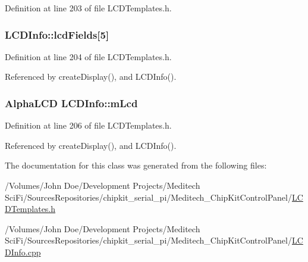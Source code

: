 Definition at line 203 of file L\-C\-D\-Templates.\-h.

\hypertarget{class_l_c_d_info_a74e827124b7095a16e00c3cff84213c7}{
\subsubsection[{lcd\-Fields}]{ L\-C\-D\-Info\-::lcd\-Fields\mbox{[}5\mbox{]}}}\label{class_l_c_d_info_a74e827124b7095a16e00c3cff84213c7}


Definition at line 204 of file L\-C\-D\-Templates.\-h.



Referenced by create\-Display(), and L\-C\-D\-Info().

\hypertarget{class_l_c_d_info_acc94f8a06df70cf4578c1d43f9dfa20b}{
\subsubsection[{m\-Lcd}]{\setlength{\rightskip}{0pt plus 5cm}Alpha\-L\-C\-D L\-C\-D\-Info\-::m\-Lcd\hspace{0.3cm}{\ttfamily [private]}}}\label{class_l_c_d_info_acc94f8a06df70cf4578c1d43f9dfa20b}


Definition at line 206 of file L\-C\-D\-Templates.\-h.



Referenced by create\-Display(), and L\-C\-D\-Info().



The documentation for this class was generated from the following files\-:\begin{DoxyCompactItemize}
\item 
/\-Volumes/\-John Doe/\-Development Projects/\-Meditech Sci\-Fi/\-Sources\-Repositories/chipkit\-\_\-serial\-\_\-pi/\-Meditech\-\_\-\-Chip\-Kit\-Control\-Panel/\hyperlink{_l_c_d_templates_8h}{L\-C\-D\-Templates.\-h}\item 
/\-Volumes/\-John Doe/\-Development Projects/\-Meditech Sci\-Fi/\-Sources\-Repositories/chipkit\-\_\-serial\-\_\-pi/\-Meditech\-\_\-\-Chip\-Kit\-Control\-Panel/\hyperlink{_l_c_d_info_8cpp}{L\-C\-D\-Info.\-cpp}\end{DoxyCompactItemize}

